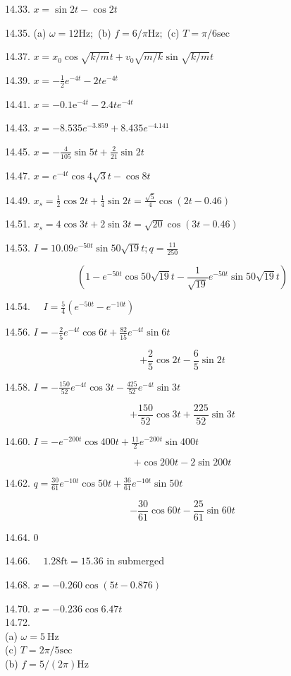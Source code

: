 \documentclass[10pt]{article}
\begin{document}
14.33. $x=\sin 2 t-\cos 2 t$

14.35. (a) $\omega=12 \mathrm{Hz;}$ (b) $f=6 / \pi \mathrm{Hz;}$ (c) $T=\pi / 6 \mathrm{sec}$

14.37. $x=x_{0} \cos \sqrt{k / m} t+v_{0} \sqrt{m / k} \sin \sqrt{k / m} t$

14.39. $x=-\frac{1}{2} e^{-4 t}-2 t e^{-4 t}$

14.41. $x=-0.1 \mathrm{e}^{-4 t}-2.4 t e^{-4 t}$

14.43. $x=-8.535 e^{-3.859}+8.435 e^{-4.141}$

14.45. $x=-\frac{4}{105} \sin 5 t+\frac{2}{21} \sin 2 t$

14.47. $x=e^{-4 t} \cos 4 \sqrt{3} t-\cos 8 t$

14.49. $x_{s}=\frac{1}{2} \cos 2 t+\frac{1}{4} \sin 2 t=\frac{\sqrt{5}}{4} \cos (2 t-0.46)$

14.51. $x_{s}=4 \cos 3 t+2 \sin 3 t=\sqrt{20} \cos (3 t-0.46)$

14.53. $I=10.09 e^{-50 t} \sin 50 \sqrt{19} t ; q=\frac{11}{250}$

$$
\left(1-e^{-50 t} \cos 50 \sqrt{19} t-\frac{1}{\sqrt{19}} e^{-50 t} \sin 50 \sqrt{19} t\right)
$$

14.54. $\quad I=\frac{5}{4}\left(e^{-50 t}-e^{-10 t}\right)$

14.56. $I=-\frac{2}{5} e^{-4 t} \cos 6 t+\frac{82}{15} e^{-4 t} \sin 6 t$

$$
+\frac{2}{5} \cos 2 t-\frac{6}{5} \sin 2 t
$$

14.58. $I=-\frac{150}{52} e^{-4 t} \cos 3 t-\frac{425}{52} e^{-4 t} \sin 3 t$

$$
+\frac{150}{52} \cos 3 t+\frac{225}{52} \sin 3 t
$$

14.60. $I=-e^{-200 t} \cos 400 t+\frac{11}{2} e^{-200 t} \sin 400 t$

$$
+\cos 200 t-2 \sin 200 t
$$

14.62. $q=\frac{30}{61} e^{-10 t} \cos 50 t+\frac{36}{61} e^{-10 t} \sin 50 t$

$$
-\frac{30}{61} \cos 60 t-\frac{25}{61} \sin 60 t
$$

14.64. 0

14.66. $\quad 1.28 \mathrm{ft}=15.36$ in submerged

14.68. $x=-0.260 \cos (5 t-0.876)$

14.70. $x=-0.236 \cos 6.47 t$\\
14.72.\\
(a) $\omega=5 \mathrm{~Hz}$\\
(c) $T=2 \pi / 5 \mathrm{sec}$\\
(b) $f=5 /(2 \pi) \mathrm{Hz}$
\end{document}
